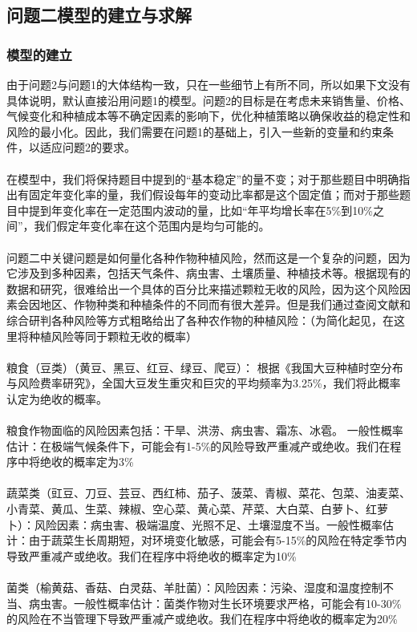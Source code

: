 \documentclass{cumcmthesis}
\begin{document}
\subsection{问题二模型的建立与求解}
\subsubsection{模型的建立}
由于问题2与问题1的大体结构一致，只在一些细节上有所不同，所以如果下文没有具体说明，默认直接沿用问题1的模型。问题2的目标是在考虑未来销售量、价格、气候变化和种植成本等不确定因素的影响下，优化种植策略以确保收益的稳定性和风险的最小化。因此，我们需要在问题1的基础上，引入一些新的变量和约束条件，以适应问题2的要求。\\\\
在模型中，我们将保持题目中提到的“基本稳定”的量不变；对于那些题目中明确指出有固定年变化率的量，我们假设每年的变动比率都是这个固定值；而对于那些题目中提到年变化率在一定范围内波动的量，比如“年平均增长率在5\%到10\%之间”，我们假定年变化率在这个范围内是均匀可能的。\\\\
问题二中关键问题是如何量化各种作物种植风险，然而这是一个复杂的问题，因为它涉及到多种因素，包括天气条件、病虫害、土壤质量、种植技术等。根据现有的数据和研究，很难给出一个具体的百分比来描述颗粒无收的风险，因为这个风险因素会因地区、作物种类和种植条件的不同而有很大差异。但是我们通过查阅文献和综合研判各种风险等方式粗略给出了各种农作物的种植风险：（为简化起见，在这里将种植风险等同于颗粒无收的概率）\\\\
粮食（豆类）（黄豆、黑豆、红豆、绿豆、爬豆）：
根据《我国大豆种植时空分布与风险费率研究》\cite{ref2}，全国大豆发生重灾和巨灾的平均频率为3.25\%，我们将此概率认定为绝收的概率。 \\\\
粮食作物面临的风险因素包括：干旱、洪涝、病虫害、霜冻、冰雹。
一般性概率估计：在极端气候条件下，可能会有1-5\%的风险导致严重减产或绝收。我们在程序中将绝收的概率定为3\%\\\\
蔬菜类（豇豆、刀豆、芸豆、西红柿、茄子、菠菜、青椒、菜花、包菜、油麦菜、小青菜、黄瓜、生菜、辣椒、空心菜、黄心菜、芹菜、大白菜、白萝卜、红萝卜）：风险因素：病虫害、极端温度、光照不足、土壤湿度不当。一般性概率估计：由于蔬菜生长周期短，对环境变化敏感，可能会有5-15\%的风险在特定季节内导致严重减产或绝收。我们在程序中将绝收的概率定为10\%\\\\
菌类（榆黄菇、香菇、白灵菇、羊肚菌）：风险因素：污染、湿度和温度控制不当、病虫害。一般性概率估计：菌类作物对生长环境要求严格，可能会有10-30\%的风险在不当管理下导致严重减产或绝收。我们在程序中将绝收的概率定为20\%\\\\
\end{document}
